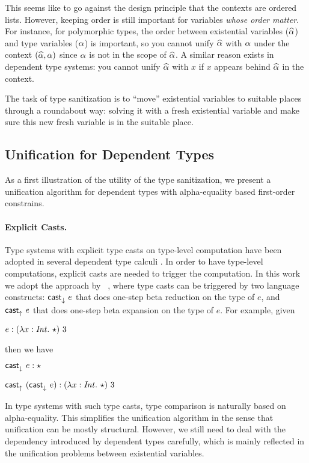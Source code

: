 This seems like to go against the design principle that the
contexts are ordered lists. However, keeping order is still important for
variables \textit{whose order matter}. For instance, for polymorphic types, the
order between existential variables ($\widehat{\alpha}$) and type variables ($\alpha$) is
important, so you cannot unify $\widehat{\alpha}$ with $\alpha$ under the context $(\widehat{\alpha},
\alpha)$ since $\alpha$ is not in the scope of $\widehat{\alpha}$. A similar reason exists in
dependent type systems: you cannot unify $\widehat{\alpha}$ with $x$ if $x$ appears behind
$\widehat{\alpha}$ in the context.

The task of type sanitization is to ``move'' existential variables to suitable
places through a roundabout way: solving it with a fresh existential variable
and make sure this new fresh variable is in the suitable place.

\subsection{Unification for Dependent Types}

As a first illustration of the utility of the type sanitization, we present a
unification algorithm for dependent types with alpha-equality based
first-order constrains.

\paragraph{Explicit Casts.}

Type systems with explicit type casts on type-level computation have been adopted
in several dependent type calculi \cite{???}. In order to
have type-level computations, explicit casts are needed to trigger the
computation. In this work we adopt the approach by ~\cite{}, where
type casts can be triggered by 
two language constructs: $\mathsf{cast}_\downarrow^{}~ e$ that does one-step beta reduction on the
type of $e$, and $\mathsf{cast}_\uparrow^{}~ e$ that does one-step beta expansion on the type of
$e$. For example, given

$e: (\lambda x:\mathit{Int}.~ \star) ~ 3$

\noindent then we have

$\mathsf{cast}_\downarrow^{}~ e : \star$

$\mathsf{cast}_\uparrow^{}~ (\mathsf{cast}_\downarrow^{}~ e) : (\lambda x:\mathit{Int}.~ \star) ~ 3$

In type systems with such type casts, type comparison is naturally based on alpha-equality. This
simplifies the unification algorithm in the sense that unification can be mostly
structural. However, we still need to deal with the dependency introduced by
dependent types carefully, which is mainly reflected in the unification problems
between existential variables.

